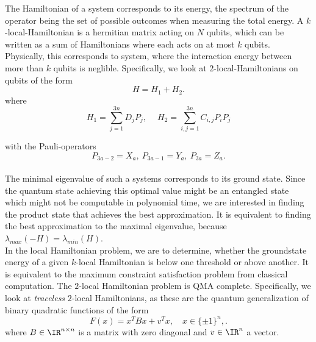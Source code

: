 The Hamiltonian of a system corresponds to its energy, the spectrum of the operator being the set of possible outcomes when measuring the total energy.
A $k$-local-Hamiltonian is a hermitian matrix acting on $N$ qubits, which can be written as a sum of Hamiltonians where each acts on at most $k$ qubits.
Physically, this corresponds to system, where the interaction energy between more than $k$ qubits is neglible.
Specifically, we look at $2$-local-Hamiltonians on qubits of the form \[
H = H_1+H_2
.\]
where
\begin{equation}\label{ham}
	H_1 = \sum_{j=1}^{3n} D_jP_j,\quad ~ H_2  = \sum_{i,j=1}^{3n} C_{i,j}P_iP_j
\end{equation}

with the Pauli-operators \[
	P_{3a-2}=X_a, ~ P_{3a-1}=Y_a, ~ P_{3a}=Z_a
.\]\\
The minimal eigenvalue of such a systems corresponds to its ground state.
Since the quantum state achieving this optimal value might be an entangled state which might not be computable in polynomial time, we are interested in finding the product state that achieves the best approximation.
It is equivalent to finding the best approximation to the maximal eigenvalue, because $\lambda_{max}(-H)=\lambda_{min}(H)$. \cite{gharibian19}\\
In the local Hamiltonian problem, we are to determine, whether the groundstate energy of a given $k$-local Hamiltonian is below one threshold or above another.
It is equivalent to the maximum constraint satisfaction problem from classical computation.
The $2$-local Hamiltonian problem is QMA complete.\cite{kempe06}
Specifically, we look at \emph{traceless} $2$-local Hamiltonians, as these are the quantum generalization of binary quadratic functions of the form \[
	F(x) = x^{T}Bx +v^{T}x, \quad x\in \{\pm 1\} ^{n},
.\]
where $B\in\IR^{n\times n}$ is a matrix with zero diagonal and $v\in\IR^{n}$ a vector.

